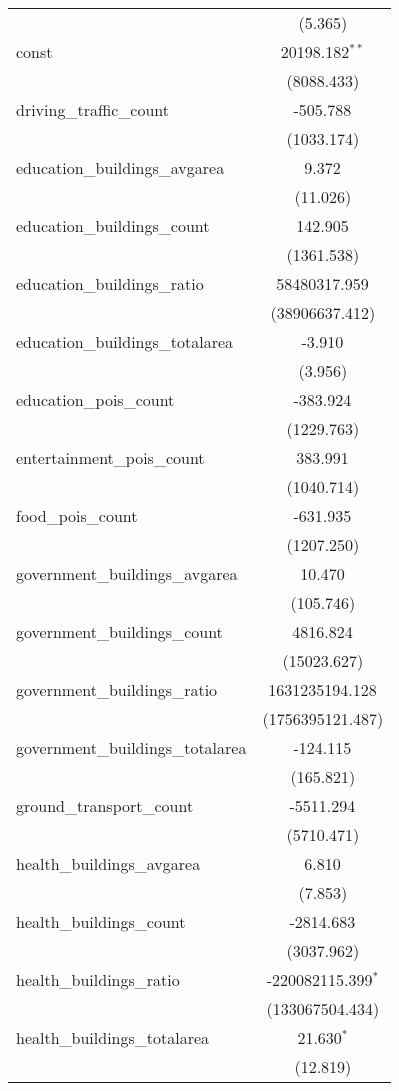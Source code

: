 \begin{table}[!htbp]
\begin{tabular}{@{\extracolsep{5pt}}lc}
  & (5.365) \\
 const & 20198.182$^{**}$ \\
  & (8088.433) \\
 driving_traffic_count & -505.788$^{}$ \\
  & (1033.174) \\
 education_buildings_avgarea & 9.372$^{}$ \\
  & (11.026) \\
 education_buildings_count & 142.905$^{}$ \\
  & (1361.538) \\
 education_buildings_ratio & 58480317.959$^{}$ \\
  & (38906637.412) \\
 education_buildings_totalarea & -3.910$^{}$ \\
  & (3.956) \\
 education_pois_count & -383.924$^{}$ \\
  & (1229.763) \\
 entertainment_pois_count & 383.991$^{}$ \\
  & (1040.714) \\
 food_pois_count & -631.935$^{}$ \\
  & (1207.250) \\
 government_buildings_avgarea & 10.470$^{}$ \\
  & (105.746) \\
 government_buildings_count & 4816.824$^{}$ \\
  & (15023.627) \\
 government_buildings_ratio & 1631235194.128$^{}$ \\
  & (1756395121.487) \\
 government_buildings_totalarea & -124.115$^{}$ \\
  & (165.821) \\
 ground_transport_count & -5511.294$^{}$ \\
  & (5710.471) \\
 health_buildings_avgarea & 6.810$^{}$ \\
  & (7.853) \\
 health_buildings_count & -2814.683$^{}$ \\
  & (3037.962) \\
 health_buildings_ratio & -220082115.399$^{*}$ \\
  & (133067504.434) \\
 health_buildings_totalarea & 21.630$^{*}$ \\
  & (12.819) \\

\end{tabular}
\end{table}
